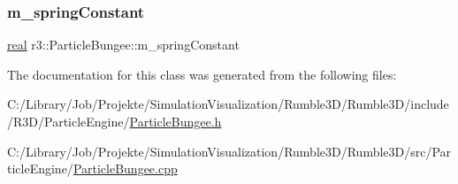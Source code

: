 \subsubsection{\texorpdfstring{m\+\_\+spring\+Constant}{m\_springConstant}}
{\footnotesize\ttfamily \mbox{\hyperlink{namespacer3_ab2016b3e3f743fb735afce242f0dc1eb}{real}} r3\+::\+Particle\+Bungee\+::m\+\_\+spring\+Constant\hspace{0.3cm}{\ttfamily [protected]}}



The documentation for this class was generated from the following files\+:\begin{DoxyCompactItemize}
\item 
C\+:/\+Library/\+Job/\+Projekte/\+Simulation\+Visualization/\+Rumble3\+D/\+Rumble3\+D/include/\+R3\+D/\+Particle\+Engine/\mbox{\hyperlink{_particle_bungee_8h}{Particle\+Bungee.\+h}}\item 
C\+:/\+Library/\+Job/\+Projekte/\+Simulation\+Visualization/\+Rumble3\+D/\+Rumble3\+D/src/\+Particle\+Engine/\mbox{\hyperlink{_particle_bungee_8cpp}{Particle\+Bungee.\+cpp}}\end{DoxyCompactItemize}
